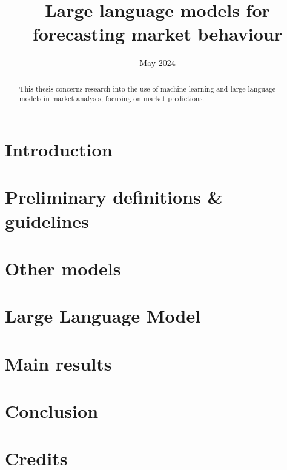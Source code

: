 \documentclass[licencjacka, en]{pracamgr}
\title{Large language models for forecasting market behaviour}
\date{May 2024}
\begin{document}
\newcommand{\rozdzial}[2]{
	\chapter{#1}
	\label{chap:#2}
	
}

\maketitle

\begin{abstract}
	This thesis concerns research into the use of machine learning
	and large language models in market analysis, focusing on market
	predictions.
\end{abstract}

\tableofcontents

\rozdzial{Introduction}{introduction}
\rozdzial{Preliminary definitions \& guidelines}{preliminary-definitions}
\rozdzial{Other models}{other-models}
\rozdzial{Large Language Model}{large-language-model}
\rozdzial{Main results}{results}
\rozdzial{Conclusion}{conclusion}
\chapter*{Credits}


\end{document}
